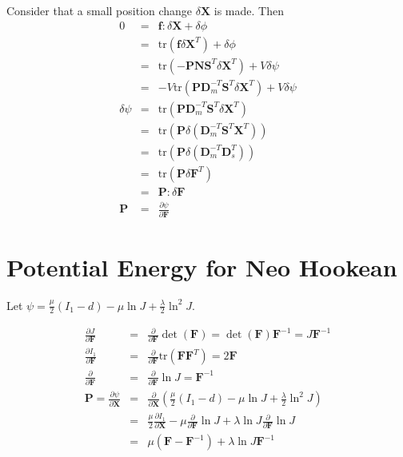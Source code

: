 \documentclass{article}
\newcommand{\F}{\mathbf{F}}
\newcommand{\N}{\mathbf{N}}
\renewcommand{\S}{\mathbf{S}}
\newcommand{\D}{\mathbf{D}}
\newcommand{\X}{\mathbf{X}}
\newcommand{\f}{\mathbf{f}}
\renewcommand{\P}{\mathbf{P}}
\newcommand{\Ds}{\D_s}
\newcommand{\Dm}{\D_m}
\newcommand{\tr}{\mbox{tr}}
\newcommand{\pp}[2]{\frac{\partial #1}{\partial #2}}
\begin{document}
Consider that a small position change $\delta \X$ is made.  Then
\begin{eqnarray*}
0 & = & \f : \delta \X + \delta \phi \\
& = & \tr(\f \delta \X^T) + \delta \phi \\
& = & \tr(-\P \N \S^T \delta \X^T) + V \delta \psi \\
& = & -V \tr(\P \Dm^{-T} \S^T \delta \X^T) + V \delta \psi \\
\delta \psi & = & \tr(\P \Dm^{-T} \S^T \delta \X^T) \\
& = & \tr(\P \delta (\Dm^{-T} \S^T \X^T)) \\
& = & \tr(\P \delta (\Dm^{-T} \Ds^T)) \\
& = & \tr(\P \delta \F^T) \\
& = & \P : \delta \F \\
\P & = & \pp{\psi}{\F}
\end{eqnarray*}

\section{Potential Energy for Neo Hookean}

Let $\psi = \frac{\mu}{2} (I_1 - d) - \mu \ln J + \frac{\lambda}{2} \ln^2 J$.

\begin{eqnarray*}
\pp{J}{\F} & = & \pp{}{\F} \det(\F) = \det(\F) \F^{-1} = J \F^{-1} \\
\pp{I_1}{\F} & = & \pp{}{\F} \tr(\F \F^T) = 2 \F \\
\pp{}{\F} & = & \pp{}{\F} \ln J = \F^{-1} \\
\P = \pp{\psi}{\X} & = & \pp{}{\X} \left( \frac{\mu}{2} (I_1 - d) - \mu \ln J + \frac{\lambda}{2} \ln^2 J \right) \\
& = & \frac{\mu}{2} \pp{I_1}{\X} - \mu \pp{}{\F} \ln J + \lambda \ln J \pp{}{\F} \ln J \\
& = & \mu (\F - \F^{-1}) + \lambda \ln J \F^{-1}
\end{eqnarray*}
\end{document}

